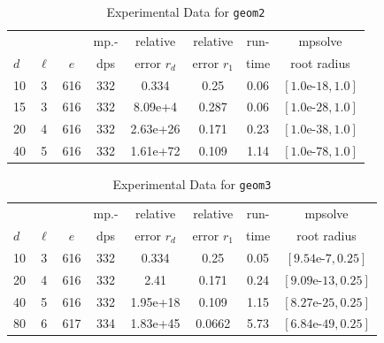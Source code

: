 \documentclass[runningheads]{llncs}
\begin{document}
\begin{table}
\caption{Experimental Data for \texttt{geom2}} %
\label{tab:geom2}
\vskip -0.15in
\begin{center}
\begin{small}
\begin{sc}
\begin{tabular}{lccccccc}
\toprule
&  &  & mp.-& relative  & relative & run- & mpsolve \\
$d$& $\ell$& $e$ & dps&error $r_d$       & error $r_1$ &time& root radius\\
\midrule
 10 & 3 & 616 & 332 & 0.334 & 0.25 & 0.06 & $[1.0\text{e-}18, 1.0]$\\
 15 & 3 & 616 & 332 & 8.09e+4 & 0.287 & 0.06 & $[1.0\text{e-}28, 1.0]$\\
 20 & 4 & 616 & 332 & 2.63e+26 & 0.171 & 0.23 & $[1.0\text{e-}38, 1.0]$\\
 40 & 5 & 616 & 332 & 1.61e+72 & 0.109 & 1.14 & $[1.0\text{e-}78, 1.0]$\\
\bottomrule
\end{tabular}
\end{sc}
\end{small}
\end{center}
\vskip 0.05in
\end{table}

\begin{table}
\caption{Experimental Data for \texttt{geom3}} %
\label{tab:geom3}
\vskip -0.15in
\begin{center}
\begin{small}
\begin{sc}
\begin{tabular}{lccccccc}
\toprule
&  &  & mp.-& relative  & relative & run- & mpsolve \\
$d$& $\ell$& $e$ & dps&error $r_d$       & error $r_1$ &time& root radius\\
\midrule
 10 & 3 & 616 & 332 & 0.334 & 0.25 & 0.05 & $[9.54\text{e-}7, 0.25]$\\
 20 & 4 & 616 & 332 & 2.41 & 0.171 & 0.24 & $[9.09\text{e-}13, 0.25]$\\
 40 & 5 & 616 & 332 & 1.95e+18 & 0.109 & 1.15 & $[8.27\text{e-}25, 0.25]$\\
 80 & 6 & 617 & 334 & 1.83e+45 & 0.0662 & 5.73 & $[6.84\text{e-}49, 0.25]$\\
\bottomrule
\end{tabular}
\end{sc}
\end{small}
\end{center}
\vskip 0.05in
\end{table}
\end{document}
